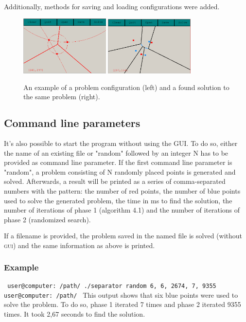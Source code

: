 \documentclass[a4paper,12pt]{article}
\begin{document}
Additionally, methods for saving and loading configurations were added.

\begin{figure}[h]
\includegraphics[width=0.4\textwidth]{pictures/gui.png}
\includegraphics[width=0.4\textwidth]{pictures/guisolved.png}
 \caption[Close up of \textit{Hemidactylus} sp.]
   {An example of a problem configuration (left) and a found solution to the same problem (right).}
\end{figure}


\subsection{Command line parameters}

It's also possible to start the program without using the \textsc{GUI}. To do so, either the name of an existing file or "random" followed by an integer N has to be provided as command line parameter. If the first command line parameter is "random", a problem consisting of N randomly placed points is generated and solved. Afterwards, a result will be printed as a series of comma-separated numbers with the pattern: the number of red points, the number of blue points used to solve the generated problem, the time in ms to find the solution, the number of iterations of phase 1 (algorithm 4.1) and the number of iterations of phase 2 (randomized search).

If a filename is provided, the problem saved in the named file is solved (without \textsc{gui}) and the same information as above is printed.
\subsubsection*{Example}
\texttt{
user@computer:~/path/\textdollar{} ./separator random 6, 6, 2674, 7, 9355\newline
user@computer:~/path/\textdollar{}
}
\newline \newline
This output shows that six blue points were used to solve the problem. To do so, phase 1 iterated 7 times and phase 2 iterated 9355 times. It took 2,67 seconds to find the solution.
\end{document}
